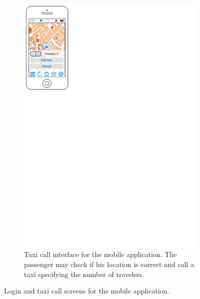 \begin{figure}[h]
\begin{subfigure}{0.45\textwidth}
        \centering
        \includegraphics[width=\textwidth]{mockup/app/TaxiCall}
        \caption{Taxi call interface for the mobile application. The passenger may check if his location is correct and call a taxi specifying the number of travelers.}
        \label{fig:mockup-taxicall-mobile}
    \end{subfigure}
    \caption{Login and taxi call screens for the mobile application.}
\end{figure}

